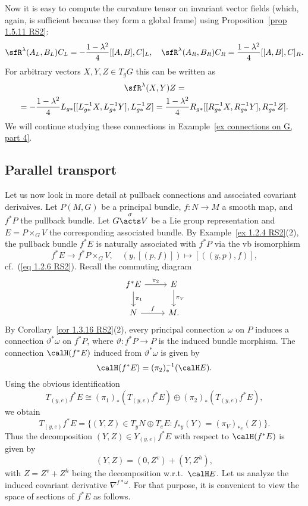 \begin{example}
    Now it is easy to compute the curvature tensor on invariant vector fields (which, again, is sufficient because they form a global frame) using Proposition~\ref{prop 1.5.11 RS2}:
    \[\sfR^\lambda(A_L,B_L)C_L=-\frac{1-\lambda^2}{4}[[A,B],C]_L,\quad \sfR^\lambda(A_R,B_R)C_R=\frac{1-\lambda^2}{4}[[A,B],C]_R.\]
    For arbitrary vectors $X,Y,Z\in T_g G$ this can be written as
    \begin{multline}
        \sfR^\lambda(X,Y)Z=\\=-\frac{1-\lambda^2}{4}L_{g\ast}[[L_{g\ast}^{-1}X,L_{g\ast}^{-1}Y],L_{g\ast}^{-1}Z]=\frac{1-\lambda^2}{4}R_{g\ast}[[R_{g\ast}^{-1}X,R_{g\ast}^{-1}Y],R_{g\ast}^{-1}Z].
    \end{multline}
    We will continue studying these connections in Example~\ref{ex connections on G, part 4}.
\end{example}









\subsection{Parallel transport}


Let us now look in more detail at pullback connections and associated covariant derivaives. Let $P(M,G)$ be a principal bundle, $f:N\to M$ a smooth map, and $f^\ast P$ the pullback bundle. Let $G\overset{\sigma}{\acts}V$ be a Lie group representation and $E=P\times_G V$ the corresponding associated bundle. By Example~\ref{ex 1.2.4 RS2}(2), the pullback bundle $f^\ast E$ is naturally associated with $f^\ast P$ via the \gls{vb} isomorphism
\[f^\ast E\to f^\ast P\times_G V,\quad (y,[(p,f)])\mapsto [((y,p),f)],\]
cf.\ (\ref{eq 1.2.6 RS2}). 
Recall the commuting diagram
\[\begin{tikzcd}
    f^\ast E\arrow[r,"\pi_2"]\arrow[d,"\pi_1"]& E\arrow[d,"\pi_V"]\\
    N\arrow[r,"f"]&M.
\end{tikzcd}\]
By Corollary~\ref{cor 1.3.16 RS2}(2), every principal connection $\omega$ on $P$ induces a connection $\vartheta^\ast\omega$ on $f^\ast P$, where $\vartheta: f^\ast P\to P$ is the induced bundle morphism. The connection $\calH (f^\ast E)$ induced from $\vartheta^\ast\omega$ is given by
\[\calH (f^\ast E)=(\pi_2)_\ast^{-1}(\calH E).\]
Using the obvious identification
\[T_{(y,e)}f^\ast E\cong (\pi_1)_\ast (T_{(y,e)}f^\ast E)\oplus (\pi_2)_\ast(T_{(y,e)}f^\ast E),\]
we obtain
\[T_{(y,e)}f^\ast E=\{(Y,Z)\in T_y N\oplus T_e E:f_{\ast y}(Y)=(\pi_V)_{\ast e}(Z)\}.\]
Thus the decomposition $(Y,Z)\in Y_{(y,e)}f^\ast E$ with respect to $\calH (f^\ast E)$ is given by
\[(Y,Z)=(0,Z^v)+(Y,Z^h),\label{eq 1.5.15 RS2}\]
with $Z=Z^v+Z^h$ being the decomposition w.r.t.\ $\calH E$. Let us analyze the induced covariant derivative $\nabla^{f\ast \omega}$. For that purpose, it is convenient to view the space of sections of $f^\ast E$ as follows.

